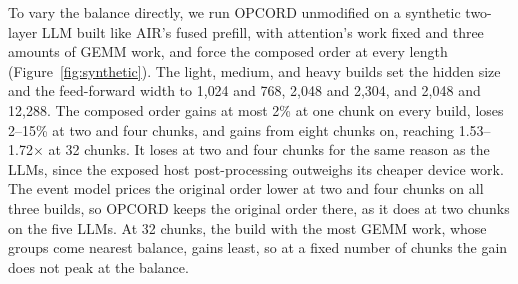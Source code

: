 To vary the balance directly, we run OPCORD unmodified on a synthetic two-layer LLM built like AIR's fused prefill, with attention's work fixed and three amounts of GEMM work, and force the composed order at every length (Figure~\ref{fig:synthetic}).
The light, medium, and heavy builds set the hidden size and the feed-forward width to 1{,}024 and 768, 2{,}048 and 2{,}304, and 2{,}048 and 12{,}288.
The composed order gains at most 2\% at one chunk on every build, loses 2--15\% at two and four chunks, and gains from eight chunks on, reaching 1.53--1.72$\times$ at 32 chunks.
It loses at two and four chunks for the same reason as the LLMs, since the exposed host post-processing outweighs its cheaper device work.
The event model prices the original order lower at two and four chunks on all three builds, so OPCORD keeps the original order there, as it does at two chunks on the five LLMs.
At 32 chunks, the build with the most GEMM work, whose groups come nearest balance, gains least, so at a fixed number of chunks the gain does not peak at the balance.

